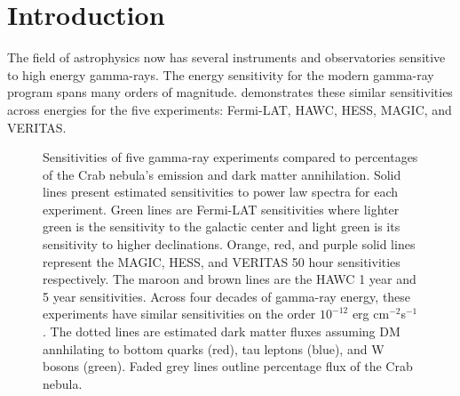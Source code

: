 \section{Introduction} \label{sec:gd_intro}

The field of astrophysics now has several instruments and observatories sensitive to high energy gamma-rays.
The energy sensitivity for the modern gamma-ray program spans many orders of magnitude.
 demonstrates these similar sensitivities across energies for the five experiments: Fermi-LAT, HAWC, HESS, MAGIC, and VERITAS.

\begin{figure}[ht]
    \caption{\ns Sensitivities of five gamma-ray experiments compared to percentages of the Crab nebula's emission and dark matter annihilation. Solid lines present estimated sensitivities to power law spectra \fu for each experiment. Green lines are Fermi-LAT sensitivities where lighter green is the sensitivity to the galactic center and light green is its sensitivity to higher declinations. Orange, red, and purple solid lines represent the MAGIC, HESS, and VERITAS 50 hour sensitivities respectively. The maroon and brown lines are the HAWC 1 year and 5 year sensitivities. Across four decades of gamma-ray energy, these experiments have similar sensitivities on the order $10^{-12}$ erg cm$^{-2}$s$^{-1}$. The dotted lines are estimated dark matter fluxes assuming DM annhilating to bottom quarks (red), tau leptons (blue), and W bosons (green). Faded grey lines outline percentage flux of the Crab nebula.}
    \label{fig:gd_motivation}
\end{figure}

